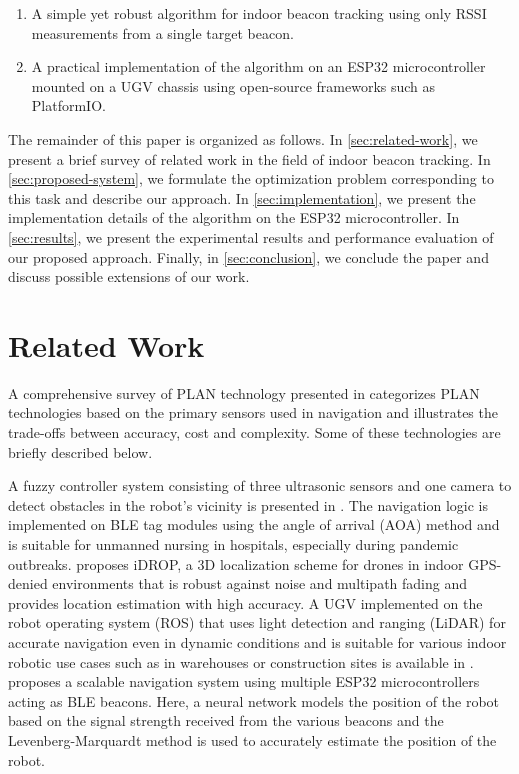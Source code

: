 \documentclass[conference]{IEEEtran}
\begin{document}
\begin{enumerate}
    \item A simple yet robust algorithm for indoor beacon tracking using only
    RSSI measurements from a single target beacon.
    \item A practical implementation of the algorithm on an ESP32
    microcontroller mounted on a UGV chassis using open-source frameworks such
    as PlatformIO.
\end{enumerate}

The remainder of this paper is organized as follows. In
\autoref{sec:related-work}, we present a brief survey of related work in the
field of indoor beacon tracking. In \autoref{sec:proposed-system}, we formulate
the optimization problem corresponding to this task and describe our approach.
In \autoref{sec:implementation}, we present the implementation details of the
algorithm on the ESP32 microcontroller. In \autoref{sec:results}, we present the
experimental results and performance evaluation of our proposed approach.
Finally, in \autoref{sec:conclusion}, we conclude the paper and discuss possible
extensions of our work.

\section{Related Work}
\label{sec:related-work}

A comprehensive survey of PLAN technology presented in
\cite{el-sheimyIndoorNavigationState2021} categorizes PLAN technologies based on
the primary sensors used in navigation and illustrates the trade-offs between
accuracy, cost and complexity. Some of these technologies are briefly described
below.

A fuzzy controller system  consisting of three ultrasonic sensors and one camera
to detect obstacles in the robot's vicinity is presented in
\cite{narayananFuzzyGuidedAutonomous2022}. The navigation logic is implemented
on BLE tag modules using the angle of arrival (AOA) method and is suitable for
unmanned nursing in hospitals, especially during pandemic outbreaks.
\cite{familiIDROPRobustLocalization2023} proposes iDROP, a 3D localization
scheme for drones in indoor GPS-denied environments that is robust against noise
and multipath fading and provides location estimation with high accuracy. A UGV
implemented on the robot operating system (ROS) that uses light detection and
ranging (LiDAR) for accurate navigation even in dynamic conditions and is
suitable for various indoor robotic use cases such as in warehouses or
construction sites is available in \cite{htROSPoweredAutonomous2024}.
\cite{yukhimetsLocalNavigationSystem2024} proposes a scalable navigation system
using multiple ESP32 microcontrollers acting as BLE beacons. Here, a neural
network models the position of the robot based on the signal strength received
from the various beacons and the Levenberg-Marquardt method is used to
accurately estimate the position of the robot. 
\end{document}

